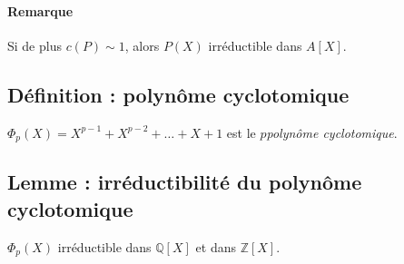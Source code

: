 \documentclass[reqno,a4paper,10pt]{report}
\newcommand{\IZ}{\ensuremath{\mathbb{Z}}\xspace} %
\newcommand{\IQ}{\ensuremath{\mathbb{Q}}\xspace} %
\begin{document}
\begin{comment}
  Preuve 16/12/09 p2
\end{comment}

\paragraph{Remarque} Si de plus $c(P) \sim 1$, alors $P(X)$ irréductible dans
$A[X]$.

\subsection{Définition : polynôme cyclotomique}
$\Phi_p(X)=X^{p-1}+X^{p-2}+\dots+X+1$ est le $p$\ieme \emph{polynôme
cyclotomique}.

\subsection{Lemme : irréductibilité du polynôme cyclotomique}
$\Phi_p(X)$ irréductible dans $\IQ[X]$ et dans $\IZ[X]$.

\pagebreak
\end{document}

